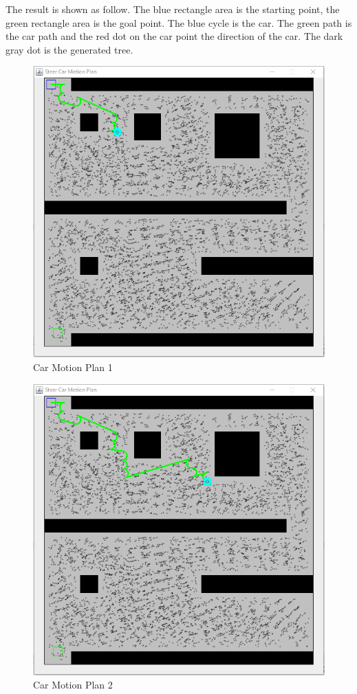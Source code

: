 \documentclass{article}
\begin{document}
The result is shown as follow. The blue rectangle area is the starting point, the green rectangle area is the goal point. The blue cycle is the car. The green path is the car path and the red dot on the car point the direction of the car. The dark gray dot is the generated tree.

\begin{figure}[!htb]
\centering
\includegraphics[width=\linewidth]{car_11}
\caption{Car Motion Plan 1}
\end{figure}
\begin{figure}[!htb]
\centering
\includegraphics[width=\linewidth]{car_12}
\caption{Car Motion Plan 2}
\end{figure}
\end{document}

